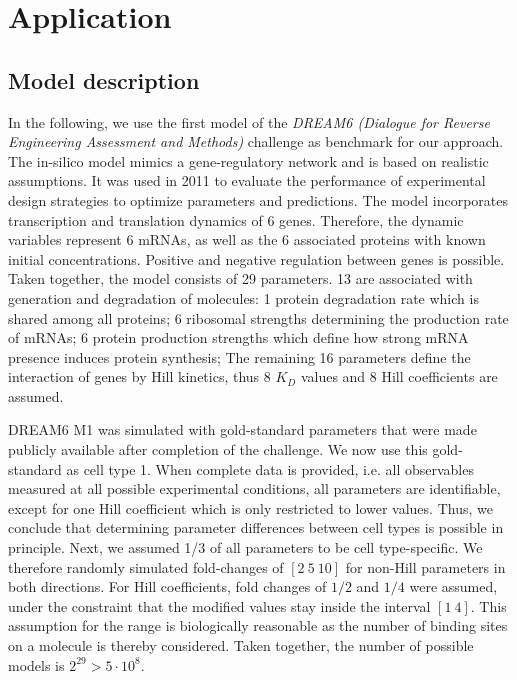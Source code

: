 \documentclass{bioinfo}
\begin{document}


\section{Application}
\subsection{Model description}
In the following, we use the first model of the \emph{DREAM6 (Dialogue for Reverse Engineering Assessment and Methods)} challenge as benchmark for our approach.
The in-silico model mimics a gene-regulatory network and is based on realistic assumptions.
It was used in 2011 to evaluate the performance of experimental design strategies to optimize parameters and predictions.
The model incorporates transcription and translation dynamics of 6 genes.
Therefore, the dynamic variables represent 6 mRNAs, as well as the 6 associated proteins with known initial concentrations.
Positive and negative regulation between genes is possible.
Taken together, the model consists of 29 parameters.
13 are associated with generation and degradation of molecules:
1 protein degradation rate which is shared among all proteins; 
6 ribosomal strengths determining the production rate of mRNAs;
6 protein production strengths which define how strong mRNA presence induces protein synthesis;
The remaining 16 parameters define the interaction of genes by Hill kinetics, thus 8 $K_D$ values and 8 Hill coefficients are assumed.

DREAM6 M1 was simulated with gold-standard parameters that were made publicly available after completion of the challenge.
We now use this gold-standard as cell type 1.
When complete data is provided, i.e. all observables measured at all possible experimental conditions, all parameters are identifiable, except for one Hill coefficient which is only restricted to lower values.
Thus, we conclude that determining parameter differences between cell types is possible in principle.
Next, we assumed 1/3 of all parameters to be cell type-specific.
We therefore randomly simulated fold-changes of $[2~5~10]$ for non-Hill parameters in both directions.
For Hill coefficients, fold changes of $1/2$ and $1/4$ were assumed, under the constraint that the modified values stay inside the interval $[1~4]$.
This assumption for the range is biologically reasonable as the number of binding sites on a molecule is thereby considered.
Taken together, the number of possible models is $2^{29}>5\cdot10^8$.
\end{document}

